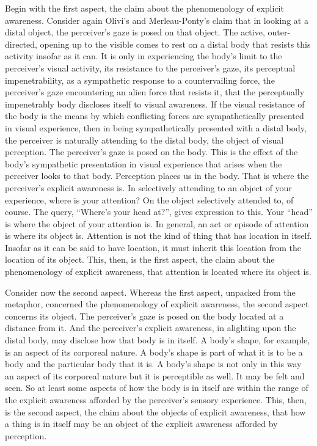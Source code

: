 Begin with the first aspect, the claim about the phenomenology of explicit awareness. Consider again Olivi's and Merleau-Ponty's claim that in looking at a distal object, the perceiver's gaze is posed on that object. The active, outer-directed, opening up to the visible comes to rest on a distal body that resists this activity insofar as it can. It is only in experiencing the body's limit to the perceiver's visual activity, its resistance to the perceiver's gaze, its perceptual impenetrability, as a sympathetic response to a countervailing force, the perceiver's gaze encountering an alien force that resists it, that the perceptually impenetrably body discloses itself to visual awareness. If the visual resistance of the body is the means by which conflicting forces are sympathetically presented in visual experience, then in being sympathetically presented with a distal body, the perceiver is naturally attending to the distal body, the object of visual perception. The perceiver's gaze is posed on the body. This is the effect of the body's sympathetic presentation in visual experience that arises when the perceiver looks to that body. Perception places us in the body. That is where the perceiver's explicit awareness is. In selectively attending to an object of your experience, where is your attention? On the object selectively attended to, of course. The query, ``Where's your head at?'', gives expression to this. Your ``head'' is where the object of your attention is. In general, an act or episode of attention is where its object is. Attention is not the kind of thing that has location in itself. Insofar as it can be said to have location, it must inherit this location from the location of its object. This, then, is the first aspect, the claim about the phenomenology of explicit awareness, that attention is located where its object is.

Consider now the second aspect. Whereas the first aspect, unpacked from the metaphor, concerned the phenomenology of explicit awareness, the second aspect concerns its object. The perceiver's gaze is posed on the body located at a distance from it. And the perceiver's explicit awareness, in alighting upon the distal body, may disclose how that body is in itself. A body's shape, for example, is an aspect of its corporeal nature. A body's shape is part of what it is to be a body and the particular body that it is. A body's shape is not only in this way an aspect of its corporeal nature but it is perceptible as well. It may be felt and seen. So at least some aspects of how the body is in itself are within the range of the explicit awareness afforded by the perceiver's sensory experience. This, then, is the second aspect, the claim about the objects of explicit awareness, that how a thing is in itself may be an object of the explicit awareness afforded by perception. 

